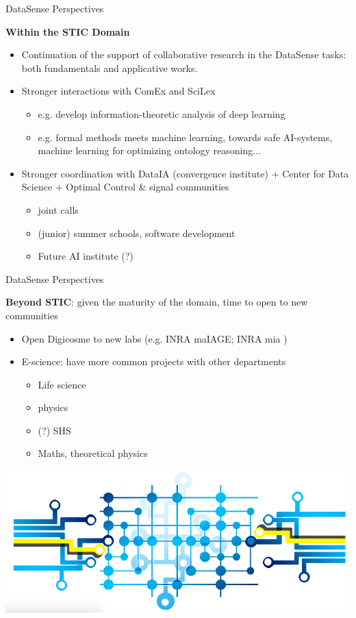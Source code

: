 \begin{frame}{DataSense Perspectives}

\textbf{Within the STIC Domain}

\begin{itemize}
\item Continuation of the support of collaborative research in the DataSense tasks: both fundamentals and applicative works.
\item Stronger interactions with ComEx and SciLex
  \begin{itemize}
  \item e.g. develop information-theoretic analysis of deep learning
  \item e.g. formal methods meets machine learning, towards safe AI-systems, machine learning for optimizing ontology reasoning...
  \end{itemize}
\item Stronger coordination with DataIA (convergence institute) + Center for Data Science + Optimal Control \& signal communities
  \begin{itemize}
  \item joint calls
  \item (junior) summer schools, software development
  \item Future AI institute (?)
  \end{itemize}
\end{itemize}
\end{frame}


\begin{frame}{DataSense Perspectives}

\textbf{Beyond STIC}: given the maturity of the domain, time to open to new communities

\begin{itemize}
\item Open Digicosme to new labs (e.g. INRA maIAGE; INRA mia )
\item E-science: have more common projects with  other departments
  \begin{itemize}
  \item Life science
  \item physics
  \item (?) SHS
  \item Maths, theoretical physics
  \end{itemize}
\end{itemize}

\begin{center}
\includegraphics[width=.75\linewidth]{Images/datasense.png}
\end{center}

\end{frame}

